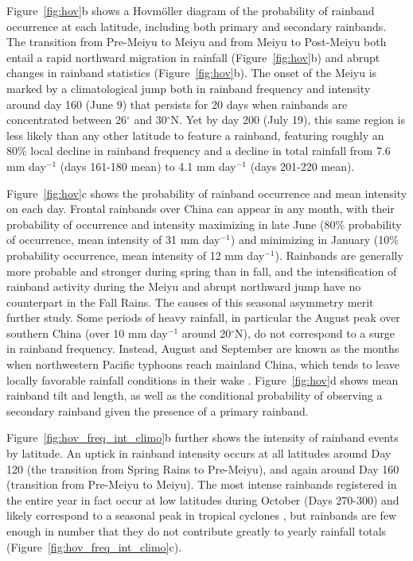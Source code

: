 \documentclass[9pt,twocolumn,twoside,lineno]{pnas-new}
\begin{document}
	Figure~\ref{fig:hov}b shows a Hovm\"oller diagram of the probability of rainband occurrence at each latitude, including both primary and secondary rainbands. The transition from Pre-Meiyu to Meiyu and from Meiyu to Post-Meiyu both entail a rapid northward migration in rainfall (Figure~\ref{fig:hov}b) and abrupt changes in rainband statistics (Figure~\ref{fig:hov}b). The onset of the Meiyu is marked by a climatological jump both in rainband frequency and intensity around day 160 (June 9) that persists for 20 days when rainbands are concentrated between 26$^\circ$ and 30$^\circ$N. Yet by day 200 (July 19), this same region is less likely than any other latitude to feature a rainband, featuring roughly an 80\% local decline in rainband frequency and a decline in total rainfall from 7.6 mm day$^{-1}$ (days 161-180 mean) to 4.1 mm day$^{-1}$ (days 201-220 mean).
	
	Figure~\ref{fig:hov}c shows the probability of rainband occurrence and mean intensity on each day. Frontal rainbands over China can appear in any month, with their probability of occurrence and intensity maximizing in late June (80\% probability of occurrence, mean intensity of 31 mm day$^{-1}$) and minimizing in January (10\% probability occurrence, mean intensity of 12 mm day$^{-1}$). Rainbands are generally more probable and stronger during spring than in fall, and the intensification of rainband activity during the Meiyu and abrupt northward jump have no counterpart in the Fall Rains. The causes of this seasonal asymmetry merit further study. Some periods of heavy rainfall, in particular the August peak over southern China (over 10 mm day$^{-1}$ around 20$^{\circ}$N), do not correspond to a surge in rainband frequency. Instead, August and September are known as the months when northwestern Pacific typhoons reach mainland China, which tends to leave locally favorable rainfall conditions in their wake \citep{Chen2007,Chen2011}. Figure~\ref{fig:hov}d shows mean rainband tilt and length, as well as the conditional probability of observing a secondary rainband given the presence of a primary rainband. 
	
	Figure~\ref{fig:hov_freq_int_climo}b further shows the intensity of rainband events by latitude. An uptick in rainband intensity occurs at all latitudes around Day 120 (the transition from Spring Rains to Pre-Meiyu), and again around Day 160 (transition from Pre-Meiyu to Meiyu). The most intense rainbands registered in the entire year in fact occur at low latitudes during October (Days 270-300) and likely correspond to a seasonal peak in tropical cyclones \citep{Liu2003}, but rainbands are few enough in number that they do not contribute greatly to yearly rainfall totals (Figure~\ref{fig:hov_freq_int_climo}c).
	
\end{document}
